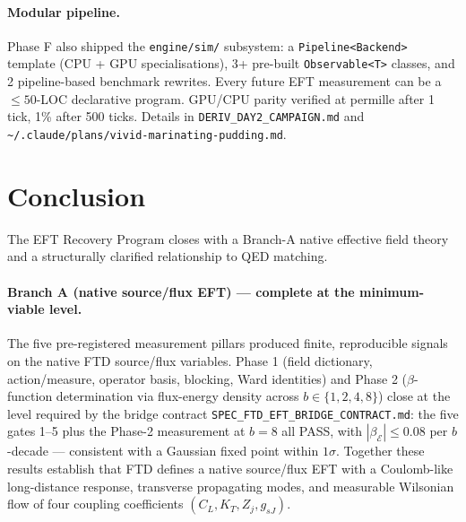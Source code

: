 \documentclass[11pt,letterpaper]{article}
\begin{document}
\paragraph{Modular pipeline.}
Phase F also shipped the \verb|engine/sim/| subsystem: a
\verb|Pipeline<Backend>| template (CPU + GPU specialisations), 3+
pre-built \verb|Observable<T>| classes, and 2 pipeline-based
benchmark rewrites. Every future EFT measurement can be a
$\leq 50$-LOC declarative program. GPU/CPU parity verified at
permille after 1 tick, 1\% after 500 ticks. Details in
\verb|DERIV_DAY2_CAMPAIGN.md| and
\verb|~/.claude/plans/vivid-marinating-pudding.md|.

\section{Conclusion}
\label{sec:conclusion}

The EFT Recovery Program closes with a Branch-A native effective field
theory and a structurally clarified relationship to QED matching.

\paragraph{Branch A (native source/flux EFT) --- complete at the
minimum-viable level.}
The five pre-registered measurement pillars produced finite,
reproducible signals on the native FTD source/flux variables. Phase 1
(field dictionary, action/measure, operator basis, blocking, Ward
identities) and Phase 2 ($\beta$-function determination via flux-energy
density across $b \in \{1, 2, 4, 8\}$) close at the level required by
the bridge contract \texttt{SPEC\_FTD\_EFT\_BRIDGE\_CONTRACT.md}: the
five gates 1--5 plus the Phase-2 measurement at $b = 8$ all PASS, with
$|\beta_{\mathcal{E}}| \le 0.08$ per $b$-decade --- consistent with a
Gaussian fixed point within $1\sigma$. Together these results establish
that FTD defines a native source/flux EFT with a Coulomb-like
long-distance response, transverse propagating modes, and measurable
Wilsonian flow of four coupling coefficients $(C_L, K_T, Z_j, g_{sJ})$.
\end{document}
